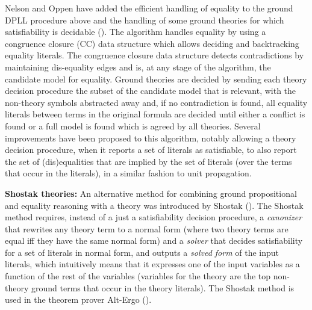 Nelson and Oppen have added the efficient handling of equality to the ground DPLL procedure above 
and the handling of some ground theories for which satisfiability is decidable (\cite{DBLP:journals/toplas/NelsonO79}).
The algorithm handles equality by using a congruence closure (CC) data structure which allows deciding and backtracking equality literals.
The congruence closure data structure detects contradictions by maintaining dis-equality edges and is, at any stage of the algorithm, the candidate model for equality. Ground theories are decided by sending each theory decision procedure the subset of the candidate model that is relevant, with the non-theory symbols abstracted away and, if no contradiction is found, all equality literals between terms in the original formula are decided until either a conflict is found or a full model is found which is agreed by all theories. Several improvements have been proposed to this algorithm, notably allowing a theory decision procedure, when it reports a set of literals as satisfiable, to also report the set of (dis)equalities that are implied by the set of literals (over the terms that occur in the literals), in a similar fashion to unit propagation.

\textbf{Shostak theories:} An alternative method for combining ground propositional and equality reasoning with a theory was introduced by Shostak (\cite{Shostak84}).
The Shostak method requires, instead of a just a satisfiability decision procedure, a \textit{canonizer} that rewrites any theory term to a normal form (where two theory terms are equal iff they have the same normal form) and a \textit{solver} that decides satisfiability for a set of literals in normal form, and outputs a \textit{solved form} of the input literals, which intuitively means that it expresses one of the input variables as a function of the rest of the variables (variables for the theory are the top non-theory ground terms that occur in the theory literals). The Shostak method is used in the theorem prover Alt-Ergo (\cite{DBLP:journals/entcs/ConchonCKL08}).


